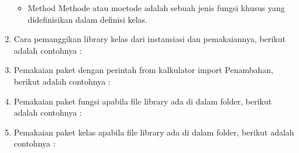 \begin{enumerate}
\begin{itemize}
		\item Method
		Methode atau moetode adalah sebuah jenis fungsi khusus yang didefinisikan dalam definisi kelas.
		
		
	\end{itemize}
	
	
	\item Cara pemanggikan library kelas dari instansiasi dan pemakaiannya, berikut adalah contohnya : 
	
	
	\item Pemakaian paket dengan perintah from kalkulator import Penambahan, berikut adalah contohnya : 
	
	
	\item Pemakaian paket fungsi apabila file library ada di dalam folder, berikut adalah contohnya : 
	
	
	\item Pemakaian paket kelas apabila file library ada di dalam folder, berikut adalah contohnya : 
	
	
\end{enumerate}

